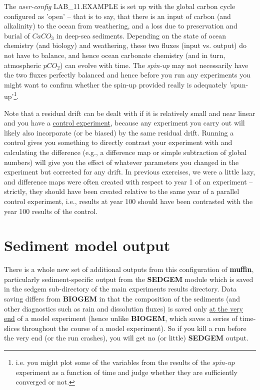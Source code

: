\documentclass[11pt,fleqn]{book} %
\begin{document}
The \textit{user-config} \textsf{\footnotesize LAB\_11.EXAMPLE } is set up with the global carbon cycle configured as 'open' -- that is to say, that there is an input of carbon (and alkalinity) to the ocean from weathering, and a loss due to preservation and burial of \(CaCO_{3}\) in deep-sea sediments. Depending on the state of ocean chemistry (and biology) and weathering, these two fluxes (input vs. output) do not have to balance, and hence ocean carbonate chemistry (and in turn, atmospheric \(pCO_{2}\)) can evolve with time. The \textit{spin-up} may not necessarily have the two fluxes perfectly balanced and hence before you run any experiments you might want to confirm whether the spin-up provided really is adequately 'spun-up'\footnote{i.e. you might plot some of the variables from the results of the \textit{spin-up}  experiment as a function of time and judge whether they are sufficiently converged or not.}.

Note that a residual drift can be dealt with if it is relatively small and near linear and you have a \uline{control experiment}, because any experiment you carry out will likely also incorporate (or be biased) by the same residual drift. Running a control gives you something to directly contrast  your experiment with and calculating the difference (e.g., a difference map or simple subtraction of global numbers) will give you the effect of whatever parameters you changed in the experiment but corrected for any drift. In previous exercises, we were a little lazy, and difference maps were often created with respect to year 1 of an experiment -- strictly, they should have been created relative to the same year of a parallel control experiment, i.e., results at year 100 should have been contrasted with the year 100 results of the control.


\newpage


\section{Sediment model output}

There is a whole new set of additional outputs from this configuration of \textbf{muffin}, particularly sediment-specific output from the \textbf{SEDGEM} module which is saved in the \textsf{\footnotesize sedgem } sub-directory of the main experiments results directory. Data saving differs from  \textbf{BIOGEM} in that the composition of the sediments (and other diagnostics such as rain and dissolution fluxes) is saved only \uline{at the very end} of a model experiment (hence unlike \textbf{BIOGEM}, which saves a series of time-slices throughout the course of a model experiment). So if you kill a run before the very end (or the run crashes),  you will get no (or little) \textbf{SEDGEM} output.
\end{document}
